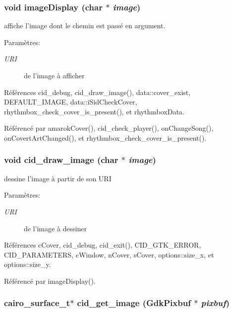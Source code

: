 \subsubsection{\setlength{\rightskip}{0pt plus 5cm}void imageDisplay (char $\ast$ {\em image})}\label{cid-gtk_8c_9c5f429709e642f6d10349260ca659f4}


affiche l'image dont le chemin est passé en argument. \begin{Desc}
\item[Paramètres:]
\begin{description}
\item[{\em URI}]de l'image à afficher \end{description}
\end{Desc}


Références cid\_\-debug, cid\_\-draw\_\-image(), data::cover\_\-exist, DEFAULT\_\-IMAGE, data::iSidCheckCover, rhythmbox\_\-check\_\-cover\_\-is\_\-present(), et rhythmboxData.

Référencé par amarokCover(), cid\_\-check\_\-player(), onChangeSong(), onCovertArtChanged(), et rhythmbox\_\-check\_\-cover\_\-is\_\-present().
\subsubsection{\setlength{\rightskip}{0pt plus 5cm}void cid\_\-draw\_\-image (char $\ast$ {\em image})}\label{cid-gtk_8c_e0482c3e4b140b468fe3e45acec0c99a}


dessine l'image à partir de son URI \begin{Desc}
\item[Paramètres:]
\begin{description}
\item[{\em URI}]de l'image à dessiner \end{description}
\end{Desc}


Références cCover, cid\_\-debug, cid\_\-exit(), CID\_\-GTK\_\-ERROR, CID\_\-PARAMETERS, cWindow, nCover, sCover, options::size\_\-x, et options::size\_\-y.

Référencé par imageDisplay().
\subsubsection{\setlength{\rightskip}{0pt plus 5cm}cairo\_\-surface\_\-t$\ast$ cid\_\-get\_\-image (GdkPixbuf $\ast$ {\em pixbuf})}\label{cid-gtk_8c_25f30bf6387751fc1e2bc76d052998da}


